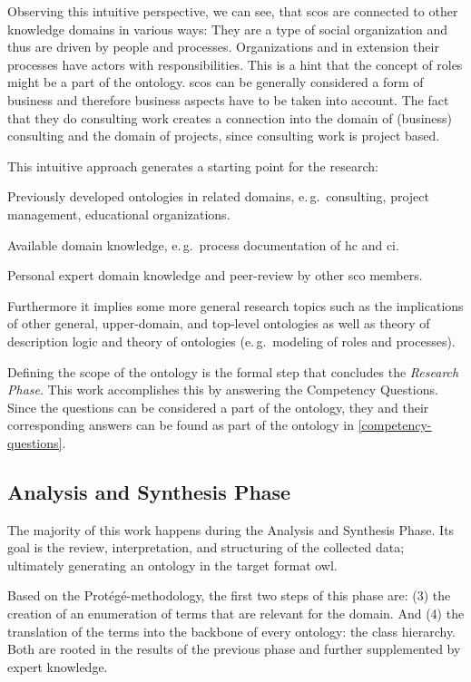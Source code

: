 \documentclass[a4paper, DIV=13, BCOR=0cm]{scrbook}
\newcommand{\eg}{e.\,g.\ }
\begin{document}
Observing this intuitive perspective, we can see, that \glspl{sco} are connected to other knowledge domains in various ways: They are a type of social organization and thus are driven by people and processes. Organizations and in extension their processes have actors with responsibilities. This is a hint that the concept of roles might be a part of the ontology. \glspl{sco} can be generally considered a form of business and therefore business aspects have to be taken into account. The fact that they do consulting work creates a connection into the domain of (business) consulting and the domain of projects, since consulting work is project based.

This intuitive approach generates a starting point for the research:
\begin{compactitem}
	\item Previously developed ontologies in related domains, \eg consulting, project management, educational organizations.
	\item Available domain knowledge, \eg process documentation of \gls{hc} and \gls{ci}.
	\item Personal expert domain knowledge and peer-review by other \gls{sco} members.
\end{compactitem}

Furthermore it implies some more general research topics such as the implications of other general, upper-domain, and top-level ontologies as well as theory of description logic and theory of ontologies (\eg modeling of roles and processes).

Defining the scope of the ontology is the formal step that concludes the \textit{Research Phase}. This work accomplishes this by answering the Competency Questions. Since the questions can be considered a part of the ontology, they and their corresponding answers can be found as part of the ontology in \autoref{competency-questions}.

\subsection{Analysis and Synthesis Phase}
\label{analysis}
The majority of this work happens during the Analysis and Synthesis Phase. Its goal is the review, interpretation, and structuring of the collected data; ultimately generating an ontology in the target format \gls{owl}.

Based on the Protégé-methodology, the first two steps of this phase are: (3) the creation of an enumeration of terms that are relevant for the domain. And (4) the translation of the terms into the backbone of every ontology: the class hierarchy. Both are rooted in the results of the previous phase and further supplemented by expert knowledge.
\end{document}
